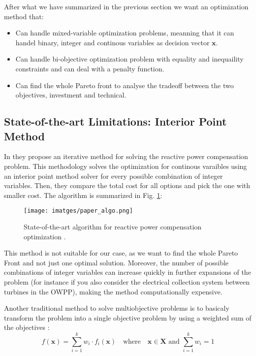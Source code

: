 \documentclass[a4paper,11pt, titlepage, twoside]{article}
\begin{document}
After what we have summarized in the previous section we want an optimization method that:
\begin{itemize}
    \item Can handle mixed-variable optimization problems, meanning that it can handel binary, integer and continous variables as decision vector $\mathbf{x}$.
    \item Can handle bi-objective optimization problem with equality and inequaility constraints and can deal with a penalty function.
    \item Can find the whole Pareto front to analyse the tradeoff between the two objectives, investment and technical.
\end{itemize}

\subsection{State-of-the-art Limitations: Interior Point Method}\label{stateofart}

In \cite{paperbase} they propose an iterative method for solving the reactive power compensation problem. This methodology solves the optimization
for continous varaibles using an interior point method solver \cite{ipm} for every possible combination of integer variables. Then, they compare the total
cost for all options and pick the one with smaller cost. The algorithm is summarized in Fig. \ref{fig:paaperalgo}:

\begin{figure}[H]
    \centering
    \texttt{[image: imatges/paper\_algo.png]}
    \caption{State-of-the-art algorithm for reactive power compensation optimization \cite{paperbase}.}
    \label{fig:paaperalgo}
\end{figure}
    


This method is not suitable for our case, as we want to find the whole Pareto Front and not just one optimal solution. Moreover, the number of possible combinations of integer variables
can increase quickly in further expansions of the problem (for instance if you also consider the electrical collection system between turbines in the OWPP), making the method computationally expensive.

Another traditional method to solve multiobjective problems is to basicaly transform the problem into a single objective problem by using a weighted sum of the objectives \cite{nsgai}:
\begin{equation}\label{weightedsum}
    f(\mathbf{x}) = \sum_{i=1}^{k} w_i \cdot f_i(\mathbf{x}) \quad \text{where} \quad \mathbf{x} \in \mathbf{X} \text{ and } \sum_{i=1}^{k} w_i = 1
\end{equation}
\end{document}
